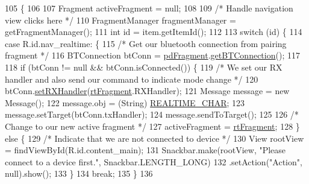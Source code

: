 \begin{DoxyCode}
105                                                            \{
106 
107         Fragment activeFragment = null;
108 
109         \textcolor{comment}{/* Handle navigation view clicks here */}
110         FragmentManager fragmentManager = getFragmentManager();
111         \textcolor{keywordtype}{int} \textcolor{keywordtype}{id} = item.getItemId();
112 
113         \textcolor{keywordflow}{switch} (\textcolor{keywordtype}{id}) \{
114             \textcolor{keywordflow}{case} R.id.nav\_realtime: \{
115                 \textcolor{comment}{/* Get our bluetooth connection from pairing fragment */}
116                 BTConnection btConn = \hyperlink{classcom_1_1jack_1_1motorbikestatistics_1_1_main_activity_a2802ad16b5fdba42834d1b31e255dd96}{pdFragment}.\hyperlink{classcom_1_1jack_1_1motorbikestatistics_1_1_pair_device_fragment_a32debe1358d94bb1c972137f60d1aa36}{getBTConnection}();
117 
118                 \textcolor{keywordflow}{if} (btConn != null && btConn.isConnected()) \{
119                     \textcolor{comment}{/* We set our RX handler and also send our command to indicate mode change */}
120                     btConn.\hyperlink{classcom_1_1jack_1_1motorbikestatistics_1_1_b_t_connection_aae8ee75e78f5beff98572bf3b13a60b8}{setRXHandler}(\hyperlink{classcom_1_1jack_1_1motorbikestatistics_1_1_main_activity_a5d506143e7f082edf2078025c00f3715}{rtFragment}.RXHandler);
121                     Message message = \textcolor{keyword}{new} Message();
122                     message.obj = (String) \hyperlink{classcom_1_1jack_1_1motorbikestatistics_1_1_main_activity_a6b63eb4aa15fd17f95f5d717e0e63108}{REALTIME\_CHAR};
123                     message.setTarget(btConn.txHandler);
124                     message.sendToTarget();
125 
126                     \textcolor{comment}{/* Change to our new active fragment */}
127                     activeFragment = \hyperlink{classcom_1_1jack_1_1motorbikestatistics_1_1_main_activity_a5d506143e7f082edf2078025c00f3715}{rtFragment};
128                 \} \textcolor{keywordflow}{else} \{
129                     \textcolor{comment}{/* Indicate that we are not connected to device */}
130                     View rootView = findViewById(R.id.content\_main);
131                     Snackbar.make(rootView, \textcolor{stringliteral}{"Please connect to a device first."}, Snackbar.LENGTH\_LONG)
132                             .setAction(\textcolor{stringliteral}{"Action"}, null).show();
133                 \}
134                 \textcolor{keywordflow}{break};
135             \}
136 

\end{DoxyCode}
